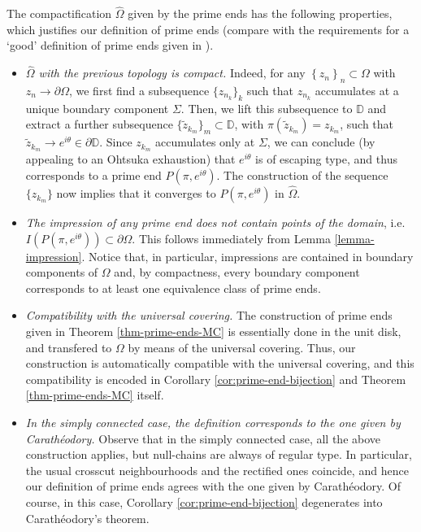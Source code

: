 \documentclass[11pt,a4paper,reqno]{amsart}
\theoremstyle{plain}
\theoremstyle{definition}
\theoremstyle{plain}
\def\DD{\mathbb{D}}
\renewcommand{\tilde}{\widetilde}
\begin{document}
The compactification $ \widehat{\Omega} $ given by the prime ends has the following properties, which justifies our definition of prime ends (compare with the requirements for a `good' definition of prime ends given in \cite{Kaufmann}).
\begin{itemize}
	\item \textit{$ \widehat{\Omega} $ with the previous topology is compact.} Indeed, for any $ \left\lbrace z_n\right\rbrace _n \subset \Omega$ with $ z_n\to\partial \Omega $, we first find a subsequence $\{z_{n_k}\}_k$ such that $z_{n_k}$ accumulates at a unique boundary component $\Sigma$. Then, we lift this subsequence to $\DD$ and extract a further subsequence $\{\tilde z_{k_m}\}_m\subset\DD$, with $\pi(\tilde z_{k_m}) = z_{k_m}$, such that $\tilde z_{k_m}\to e^{i\theta}\in\partial\DD$. Since $z_{k_m}$ accumulates only at $\Sigma$, we can conclude (by appealing to an Ohtsuka exhaustion) that $e^{i\theta}$ is of escaping type, and thus corresponds to a prime end $P(\pi, e^{i\theta})$. The construction of the sequence $\{z_{k_m}\}$ now implies that it converges to $P(\pi, e^{i\theta})$ in $\widehat\Omega$.
	\item \textit{The impression of any prime end does not contain points of the domain}, i.e. $ I (P(\pi, e^{i\theta}))\subset\partial\Omega $. This follows immediately from Lemma \ref{lemma-impression}. Notice that, in particular, impressions are contained in boundary components of $ \Omega $ and, by compactness, every boundary component corresponds to at least one equivalence class of prime ends.
	\item \textit{Compatibility with the universal covering.} The construction of prime ends given in Theorem \ref{thm-prime-ends-MC} is essentially done in the unit disk, and transfered to $ \Omega $ by means of the universal covering. Thus, our construction is automatically compatible with the universal covering, and this compatibility is encoded in Corollary \ref{cor:prime-end-bijection} and Theorem \ref{thm-prime-ends-MC} itself.
	\item \textit{In the simply connected case, the definition corresponds to the one given by Carathéodory.} Observe that in the simply connected case, all the above construction applies, but null-chains are always of regular type. In particular, the usual crosscut neighbourhoods and the rectified ones coincide, and hence our definition of prime ends agrees with the one given by Carathéodory. Of course, in this case, Corollary \ref{cor:prime-end-bijection} degenerates into Carathéodory's theorem.
\end{itemize}	
\end{document}
